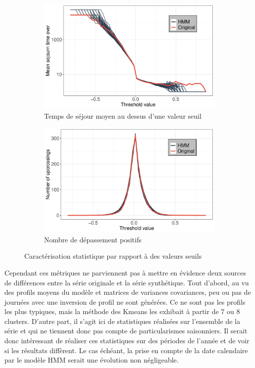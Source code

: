 \documentclass[12pt, french]{report}
\begin{document}
\begin{figure}[htbp] 
	\begin{subfigure}[b]{0.5\linewidth}
		\centering
		\includegraphics[width = 0.95 \linewidth]{Images/PV/HMM/Stats/MDO.pdf}
		\caption{Temps de séjour moyen au dessus d'une valeur seuil}
		\label{fig:PV_HMM_Stat_MDO}
	\end{subfigure}%
	\begin{subfigure}[b]{0.5\linewidth}
		\centering
		\includegraphics[width = 0.95 \linewidth]{Images/PV/HMM/Stats/NU.pdf}
		\caption{Nombre de dépassement positifs}
		\label{fig:PV_HMM_Stat_NU}
	\end{subfigure}
	
	\caption{Caractérisation statistique par rapport à des valeurs seuils}
	\label{fig:PV_HMM_Stat_MDONU} 
\end{figure}

Cependant ces métriques ne parviennent pas à mettre en évidence deux sources de différences entre la série originale et la série synthétique. Tout d'abord, au vu des profils moyens du modèle et matrices de variances covariances, peu ou pas de journées avec une inversion de profil ne sont générées. Ce ne sont pas les profils les plus typiques, mais la méthode des Kmeans les exhibait à partir de 7 ou 8 clusters. D'autre part, il s'agit ici de statistiques réalisées sur l'ensemble de la série et qui ne tiennent donc pas compte de particularismes saisonniers. Il serait donc intéressant de réaliser ces statistiques sur des périodes de l'année et de voir si les résultats diffèrent. Le cas échéant, la prise en compte de la date calendaire par le modèle HMM serait une évolution non négligeable.
\end{document}
